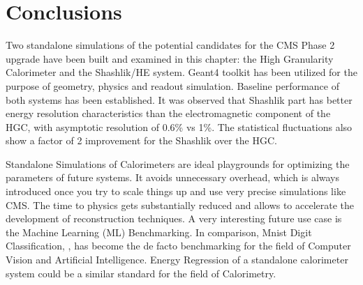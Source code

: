 \section{Conclusions} \label{section:simulations_conclusions}
Two standalone simulations of the potential candidates for the CMS Phase 2 upgrade have been built and examined in this chapter: the High Granularity Calorimeter and the Shashlik/HE system. {\sc Geant4} toolkit has been utilized for the purpose of geometry, physics and readout simulation. Baseline performance of both systems has been established. It was observed that Shashlik part has better energy resolution characteristics than the electromagnetic component of the HGC, with asymptotic resolution of 0.6\% vs 1\%. The statistical fluctuations also show a factor of 2 improvement for the Shashlik over the HGC.

Standalone Simulations of Calorimeters are ideal playgrounds for optimizing the parameters of future systems. It avoids unnecessary overhead, which is always introduced once you try to scale things up and use very precise simulations like CMS. The time to physics gets substantially reduced and allows to accelerate the development of reconstruction techniques. A very interesting future use case is the Machine Learning (ML) Benchmarking. In comparison, {\sc Mnist} Digit Classification, \cite{mnist}, has become the de facto benchmarking for the field of Computer Vision and Artificial Intelligence. Energy Regression of a standalone calorimeter system could be a similar standard for the field of Calorimetry.